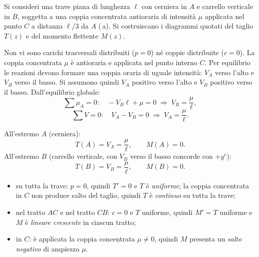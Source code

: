 \begin{esempio}
	Si consideri una trave piana di lunghezza $\ell$
	con cerniera in $A$ e carrello verticale in $B$,
	soggetta a una coppia concentrata antioraria di
	intensità $\mu$ applicata nel punto $C$ a
	distanza $\ell/3$ da $A$ (\,a).
	Si costruiscano i diagrammi quotati del taglio $T(z)$
	e del momento flettente $M(z)$.
	
	\begin{svolgimento}
		
		



		
		
		Non vi sono carichi trasversali distribuiti
		($p = 0$) né coppie distribuite ($c = 0$).
		La coppia concentrata $\mu$ è antioraria
		e applicata nel punto interno $C$. Per equilibrio le reazioni devono
		formare una coppia oraria di uguale intensità:
		$V_A$ verso l'alto e $V_B$ verso il basso.
		Si assumono quindi $V_A$ positivo verso l'alto
		e $V_B$ positivo verso il basso.
		Dall'equilibrio globale:
		\[
		\sum \mu_A = 0:\quad
		-V_B\ell + \mu = 0
		\;\Rightarrow\;
		V_B = \frac{\mu}{\ell},
		\]
		\[
		\sum V = 0:\quad
		V_A - V_B = 0
		\;\Rightarrow\;
		V_A = \frac{\mu}{\ell}.
		\]
		
		All'estremo $A$ (cerniera):
		\[
		T(A) = V_A = \frac{\mu}{\ell}, \qquad M(A) = 0.
		\]
		All'estremo $B$ (carrello verticale, con $V_B$
		verso il basso concorde con $+y^e$):
		\[
		T(B) = V_B = \frac{\mu}{\ell}, \qquad M(B) = 0.
		\]
		
		\begin{itemize}[nosep]
			\item su tutta la trave: $p = 0$, quindi
			$T' = 0$ e $T$ è \emph{uniforme};
			la coppia concentrata in $C$ non
			produce salto del taglio, quindi $T$
			è \emph{continuo} su tutta la trave;
			\item nel tratto $AC$ e nel tratto $CB$:
			$c = 0$ e $T$ uniforme, quindi
			$M' = T$ uniforme e $M$ è
			\emph{lineare crescente} in
			ciascun tratto;
			\item in $C$: è applicata la coppia
			concentrata $\mu \neq 0$, quindi
			$M$ presenta un \emph{salto negativo}
			di ampiezza $\mu$.
		\end{itemize}
		

\end{svolgimento}
\end{esempio}

